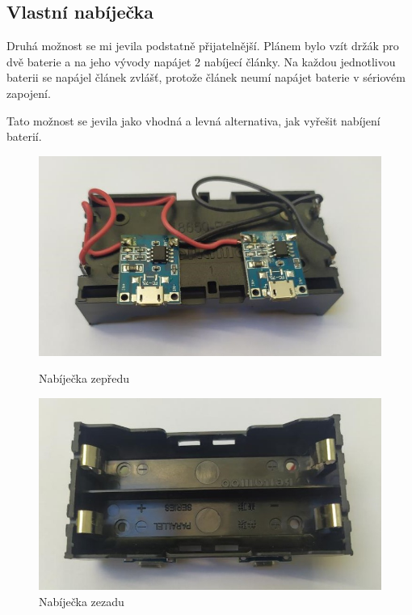 \subsection{Vlastní nabíječka}
Druhá možnost se mi jevila podstatně přijatelnější. Plánem bylo vzít držák pro dvě baterie a na jeho vývody napájet 2 nabíjecí články. Na každou jednotlivou baterii se napájel článek zvlášť, protože článek neumí napájet baterie v sériovém zapojení.

Tato možnost se jevila jako vhodná a levná alternativa, jak vyřešit nabíjení baterií. 

    \begin{figure}[htbp]
	\centering
	\begin{minipage}[b]{0.45\textwidth}
		\centering
		\includegraphics[width=1\textwidth]{img/02 ele/Nabijecka.jpg}
		\caption{Nabíječka zepředu}
	\end{minipage}
	\qquad
	\begin{minipage}[b]{0.45\textwidth}
		\centering
		\includegraphics[width=1\textwidth]{img/02 ele/Nabijecka 2.jpg}
		\caption{Nabíječka zezadu}
	\end{minipage}
\end{figure}
\newpage



